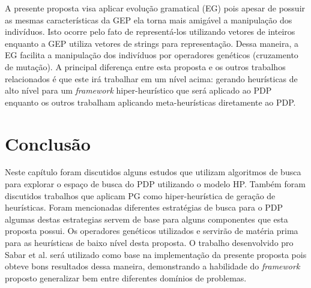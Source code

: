 A presente proposta visa aplicar evolução gramatical (EG) pois apesar de possuir as mesmas características da GEP ela torna mais amigável a manipulação dos indivíduos. Isto ocorre pelo fato de representá-los utilizando vetores de inteiros enquanto a GEP utiliza vetores de strings para representação. Dessa maneira, a EG facilita a manipulação dos indivíduos por operadores genéticos (cruzamento de mutação). A principal diferença entre esta proposta e os outros trabalhos relacionados \cite{santanna2008,shmygelska2002ant,shmygelska2003improved,hsu2003growth, krasnogor2002multimeme,krasnogor2002multimeme,unger1993genetic} é que este irá trabalhar em um nível acima: gerando heurísticas de alto nível para um \textit{framework} hiper-heurístico que será aplicado ao PDP enquanto os outros trabalham aplicando meta-heurísticas diretamente ao PDP. 





\section{Conclusão}
\label{TrabalhosRelacionados:Conclusão}

Neste capítulo foram discutidos alguns estudos que utilizam algoritmos de busca para explorar o espaço de busca do PDP utilizando o modelo HP. Também foram discutidos trabalhos que aplicam PG como hiper-heurística de geração de heurísticas. Foram mencionadas diferentes estratégias de busca para o PDP algumas destas estrategias servem de base para alguns componentes que esta proposta possui. Os operadores genéticos utilizados \cite{custodio2014multiple} e \cite{lin2011protein} servirão de matéria prima para as heurísticas de baixo nível desta proposta. O trabalho desenvolvido pro Sabar et al. \cite{sabar2015automatic} será utilizado como base na implementação da presente proposta pois obteve bons resultados dessa maneira, demonstrando a habilidade do \textit{framework} proposto generalizar bem entre diferentes domínios de problemas.